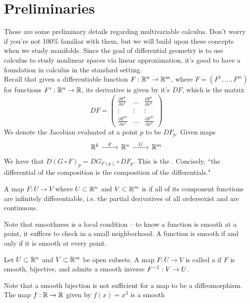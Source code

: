 %
\setcounter{section}{-1}
%
\section{Preliminaries}
%
These are some preliminary details regarding multivariable calculus. Don't
worry if you're not 100\% familiar with them, but we will build upon these
concepts when we study manifolds. Since the goal of differential geometry
is to use calculus to study nonlinear spaces via linear approximation,
it's good to have a foundation in calculus in the standard setting.\\

Recall that given a differentiable function $F: \mathbb{R}^n \to \mathbb{R}^m$, where
$F = (F^1, \ldots, F^m)$ for functions $F^i : \mathbb{R}^n \to \mathbb{R}$, its derivative
is given by it's  $DF$, which is the matrix
$$DF = \begin{pmatrix}
\frac{\partial F^1}{\partial x^1} &
\ldots & \frac{\partial F^1}{\partial x^n} \\
\vdots & \vdots & \vdots \\
\frac{\partial F^m}{\partial x^1} &
\ldots & \frac{\partial F^m}{\partial x^n}
\end{pmatrix} $$
We denote the Jacobian evaluated at a point $p$ to be $DF_p$. Given maps
$$\begin{tikzcd}
\R^k \ar[r,"F"] & \R^n \ar[r, "G"] & \R^m
\end{tikzcd}$$
We have that $D(G \circ F)_p = DG_{F(p)} \circ DF_p$. This is the
. Concisely, ``the differential of the
composition is the composition of the differentials."
%
\begin{defn}
	A map $F : U \to V$ where $U \subset \mathbb{R}^n$ and $V \subset \mathbb{R}^m$ is
	 if all of its component functions are infinitely
	differentiable, i.e. the partial derivatives of all ordersexist and are
	continuous.
\end{defn}
%
Note that smoothness is a local condition -- to know a function is smooth
at a point, it suffices to check in a small neighborhood. A function is
smooth if and only if it is smooth at every point.
%
\begin{defn}
	Let $U \subset \mathbb{R}^n$ and $V \subset \mathbb{R}^m$ be open subsets. A map
	$F : U \to V$ is called a  if $F$ is smooth,
	bijective, and admits a smooth inverse $F^{-1} : V \to U$.
\end{defn}
%
Note that a smooth bijection is not sufficient for a map to be a
diffeomorphism. The map $f : \mathbb{R} \to \mathbb{R}$ given by $f(x) = x^3$ is a smooth
